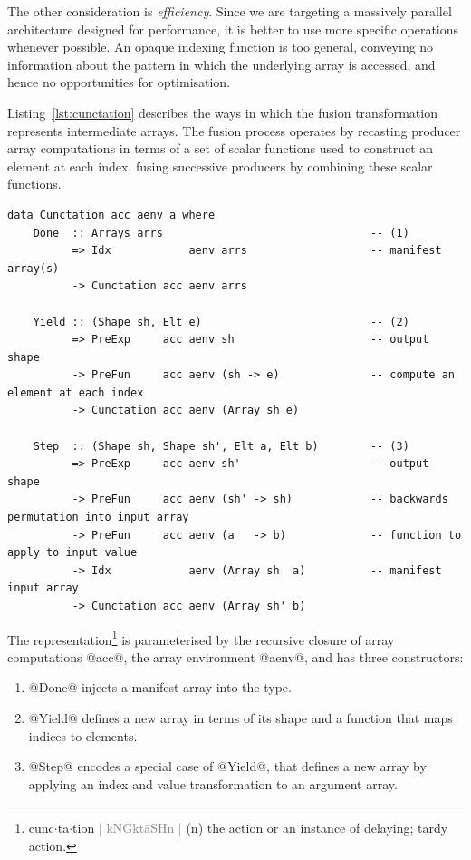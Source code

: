 The other consideration is \emph{efficiency}. Since we are targeting a massively
parallel architecture designed for performance, it is better to use more
specific operations whenever possible. An opaque indexing function is too
general, conveying no information about the pattern in which the underlying
array is accessed, and hence no opportunities for optimisation.

Listing~\ref{lst:cunctation} describes the ways in which the fusion
transformation represents intermediate arrays. The fusion process operates by
recasting producer array computations in terms of a set of scalar functions used
to construct an element at each index, %
fusing successive producers by combining these scalar functions.
%
\begin{lstlisting}[style=haskell_float
    ,label=lst:cunctation
    ,caption={Representation of fusible producer arrays}]
data Cunctation acc aenv a where
    Done  :: Arrays arrs                                -- (1)
          => Idx            aenv arrs                   -- manifest array(s)
          -> Cunctation acc aenv arrs

    Yield :: (Shape sh, Elt e)                          -- (2)
          => PreExp     acc aenv sh                     -- output shape
          -> PreFun     acc aenv (sh -> e)              -- compute an element at each index
          -> Cunctation acc aenv (Array sh e)

    Step  :: (Shape sh, Shape sh', Elt a, Elt b)        -- (3)
          => PreExp     acc aenv sh'                    -- output shape
          -> PreFun     acc aenv (sh' -> sh)            -- backwards permutation into input array
          -> PreFun     acc aenv (a   -> b)             -- function to apply to input value
          -> Idx            aenv (Array sh  a)          -- manifest input array
          -> Cunctation acc aenv (Array sh' b)
\end{lstlisting}
%
\makeatchar
The representation\footnote{%
cunc$\cdot$ta$\cdot$tion
\textcolor{gray}{|
kNGk\textquotesingle t\={a}SHn \enspace{}\textquotesingle {}
|} (n) the action or an instance of delaying; tardy action.}
\makeatcode
%
is parameterised by the recursive closure of array computations @acc@, the
array environment @aenv@, and has three constructors:
%
\begin{enumerate}
\item @Done@ injects a manifest array into the type.

\item @Yield@ defines a new array in terms of its shape and a function
    that maps indices to elements.

\item @Step@ encodes a special case of @Yield@, that defines a new
    array by applying an index and value transformation to an argument array.

\end{enumerate}

